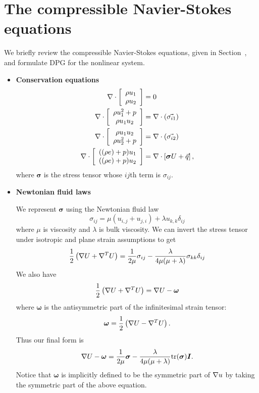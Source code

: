 \section{The compressible Navier-Stokes equations}

We briefly review the compressible Navier-Stokes equations, given in Section~, and formulate DPG for the nonlinear system. 
\begin{itemize}
\item \textbf{Conservation equations}
\begin{align*}
\div \vecttwo{\rho u_1 }{\rho u_2} &= 0\\
\div \vecttwo{\rho u_1^2+p }{\rho u_1 u_2} &= \div\left(\vec{\sigma_{i1}}\right)\\
\div \vecttwo{\rho u_1 u_2}{\rho u_2^2+p } &= \div\left(\vec{\sigma_{i2}}\right)\\
\div\vecttwo{((\rho e)+p)u_1}{((\rho e)+p)u_2} &= \div\left[\boldsymbol\sigma U + \vec{q}\right],
\end{align*}
where $\boldsymbol \sigma$ is the stress tensor whose $ij$th term is $\sigma_{ij}$.  

\item \textbf{Newtonian fluid laws}

We represent $\boldsymbol\sigma$ using the Newtonian fluid law
\[
\sigma_{ij} = \mu(u_{i,j} + u_{j,i}) + \lambda u_{k,k} \delta_{ij}
\]
where $\mu$ is viscosity and $\lambda$ is bulk viscosity. 
We can invert the stress tensor under isotropic and plane strain assumptions to get
\[
\frac{1}{2}\left(\grad  U + \grad ^T  U\right) = \frac{1}{2\mu} \sigma_{ij} - \frac{\lambda}{4\mu (\mu + \lambda)} \sigma_{kk}\delta_{ij}
\]
We also have
\[
\frac{1}{2}\left(\grad  U + \grad ^T  U\right) = \grad  U - \boldsymbol \omega
\]
where $\boldsymbol \omega$ is the antisymmetric part of the infinitesimal strain tensor:
\[
\boldsymbol \omega = \frac{1}{2}\left(\grad  U - \grad ^T  U\right).
\]
Thus our final form is
\begin{align*}
\grad  U - \boldsymbol \omega = \frac{1}{2\mu} \boldsymbol \sigma - \frac{\lambda}{4\mu (\mu + \lambda)} { \rm tr}(\boldsymbol \sigma) \boldsymbol I.
\end{align*}
Notice that $\boldsymbol \omega$ is implicitly defined to be the symmetric part of $\grad u$ by taking the symmetric part of the above equation. 


\end{itemize}
